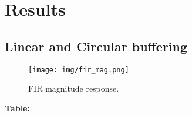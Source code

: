 \documentclass{article}
\begin{document}

\section{Results}

\subsection{Linear and Circular buffering}

\begin{figure}[h]
  \begin{center}
    \texttt{[image: img/fir\_mag.png]}
    \caption{FIR magnitude response.}
  \end{center}
\end{figure}

\pagebreak
\textbf{Table:}
\end{document}
